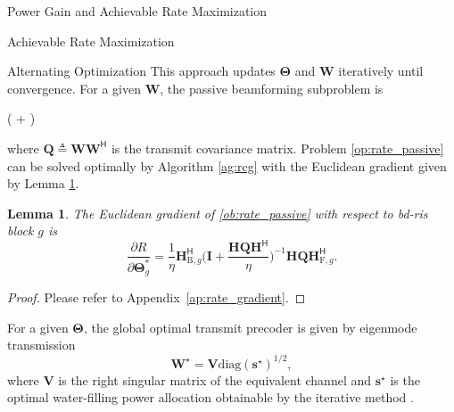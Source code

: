 \documentclass[journal]{IEEEtran}
\newtheorem{lemma}{Lemma}
\begin{document}
\begin{section}{Power Gain and Achievable Rate Maximization}
\begin{subsection}{Achievable Rate Maximization}
		\begin{subsubsection}{Alternating Optimization}
			This approach updates $\mathbf{\Theta}$ and $\mathbf{W}$ iteratively until convergence.
			For a given $\mathbf{W}$, the passive beamforming subproblem is
			\begin{maxi!}
				{\scriptstyle{\mathbf{\Theta}}}{\log \det \biggl( + \biggr)}{\label{op:rate_passive}}{\label{ob:rate_passive}}
			\end{maxi!}
			where $\mathbf{Q} \triangleq \mathbf{W} \mathbf{W}^\mathsf{H}$ is the transmit covariance matrix.
			Problem \eqref{op:rate_passive} can be solved optimally by Algorithm \ref{ag:rcg} with the Euclidean gradient given by Lemma \ref{lm:rate_gradient}.
			\begin{lemma}\label{lm:rate_gradient}
				The Euclidean gradient of \eqref{ob:rate_passive} with respect to \gls{bd}-\gls{ris} block $g$ is
				\begin{equation}
					\frac{\partial R}{\partial \mathbf{\Theta}_g^*} = \frac{1}{\eta} \mathbf{H}_{\mathrm{B},g}^\mathsf{H} \biggl(\mathbf{I} + \frac{\mathbf{H}\mathbf{Q}\mathbf{H}^\mathsf{H}}{\eta}\biggr)^{-1} \mathbf{H} \mathbf{Q} \mathbf{H}_{\mathrm{F},g}^\mathsf{H}.
					\label{eq:rate_gradient}
				\end{equation}
			\end{lemma}

			\begin{proof}
				Please refer to Appendix~\ref{ap:rate_gradient}.
			\end{proof}
			For a given $\mathbf{\Theta}$, the global optimal transmit precoder is given by eigenmode transmission \cite{Clerckx2013}
			\begin{equation}
				\mathbf{W}^\star = \mathbf{V} {\mathrm{diag}(\mathbf{s}^\star)}^{1/2},
				\label{eq:precoder_eigenmode}
			\end{equation}
			where $\mathbf{V}$ is the right singular matrix of the equivalent channel and $\mathbf{s}^\star$ is the optimal water-filling power allocation obtainable by the iterative method \cite{Tse2005}.


\end{subsubsection}
\end{subsection}
\end{section}
\end{document}

